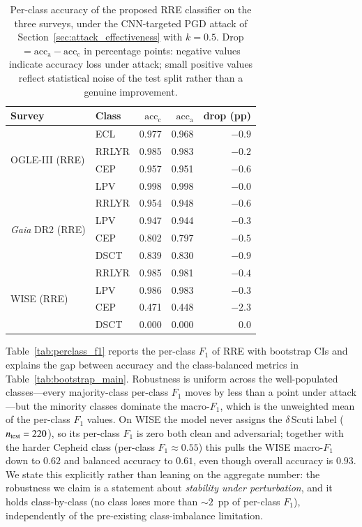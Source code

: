 \documentclass{aa}
\begin{document}
\begin{table}[htbp]
\centering
\caption{Per-class accuracy of the proposed RRE classifier on the three
surveys, under the CNN-targeted PGD attack of
Section~\ref{sec:attack_effectiveness} with $k=0.5$. Drop $= \mathrm{acc}_{\mathrm{a}}
- \mathrm{acc}_{\mathrm{c}}$ in percentage points: negative values indicate
accuracy loss under attack; small positive values reflect statistical
noise of the test split rather than a genuine improvement.}
\label{tab:per_class_l5_multi}
\small
\begin{tabular}{llrrr}
\toprule
Survey & Class & $\mathrm{acc}_{\mathrm{c}}$ & $\mathrm{acc}_{\mathrm{a}}$ & drop (pp) \\
\midrule
\multirow{4}{*}{OGLE-III (RRE)}
 & ECL   & 0.977 & 0.968 & $-0.9$ \\
 & RRLYR & 0.985 & 0.983 & $-0.2$ \\
 & CEP   & 0.957 & 0.951 & $-0.6$ \\
 & LPV   & 0.998 & 0.998 & $-0.0$ \\
\midrule
\multirow{4}{*}{\textit{Gaia} DR2 (RRE)}
 & RRLYR & 0.954 & 0.948 & $-0.6$ \\
 & LPV   & 0.947 & 0.944 & $-0.3$ \\
 & CEP   & 0.802 & 0.797 & $-0.5$ \\
 & DSCT  & 0.839 & 0.830 & $-0.9$ \\
\midrule
\multirow{4}{*}{WISE (RRE)}
 & RRLYR & 0.985 & 0.981 & $-0.4$ \\
 & LPV   & 0.986 & 0.983 & $-0.3$ \\
 & CEP   & 0.471 & 0.448 & $-2.3$ \\
 & DSCT  & 0.000 & 0.000 & $\phantom{-}0.0$ \\
\bottomrule
\end{tabular}
\end{table}

Table~\ref{tab:perclass_f1} reports the per-class $F_1$ of RRE with bootstrap CIs and explains the gap between accuracy and the class-balanced metrics in Table~\ref{tab:bootstrap_main}. Robustness is uniform across the well-populated classes---every majority-class per-class $F_1$ moves by less than a point under attack---but the minority classes dominate the macro-$F_1$, which is the unweighted mean of the per-class $F_1$ values. On WISE the model never assigns the $\delta$\,Scuti label ($n_{\rm test}=220$), so its per-class $F_1$ is zero both clean and adversarial; together with the harder Cepheid class (per-class $F_1\approx0.55$) this pulls the WISE macro-$F_1$ down to $0.62$ and balanced accuracy to $0.61$, even though overall accuracy is $0.93$. We state this explicitly rather than leaning on the aggregate number: the robustness we claim is a statement about \emph{stability under perturbation}, and it holds class-by-class (no class loses more than ${\sim}2$~pp of per-class $F_1$), independently of the pre-existing class-imbalance limitation.
\end{document}
